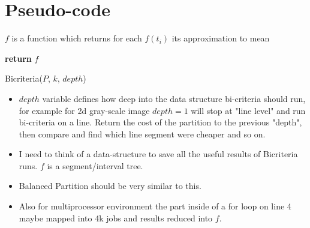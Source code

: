 \documentclass[12pt, a4paper]{article}
\begin{document}
                        \section{Pseudo-code}
\(f\) is a function which returns for each \(f(t_i)\) its approximation to mean
\begin{algorithm}


\textbf{return} $f$\;

\caption{Bicriteria($P$, $k$, $depth$)}
\end{algorithm}

\begin{itemize}
  \item $depth$ variable defines how deep into the data structure bi-criteria should run,
  for example for 2d gray-scale image $depth = 1$ will stop at "line level" and run bi-criteria
  on a line. Return the cost of the partition to the previous "depth", then compare and find
  which line segment were cheaper and so on.

  \item I need to think of a data-structure to save all the useful results of Bicriteria runs.
  $f$ is a segment/interval tree.

  \item Balanced Partition should be very similar to this.

  \item Also for multiprocessor environment the part inside of a for loop on line 4 maybe mapped into 4k jobs and results reduced into $f$.
\end{itemize}
\end{document}
